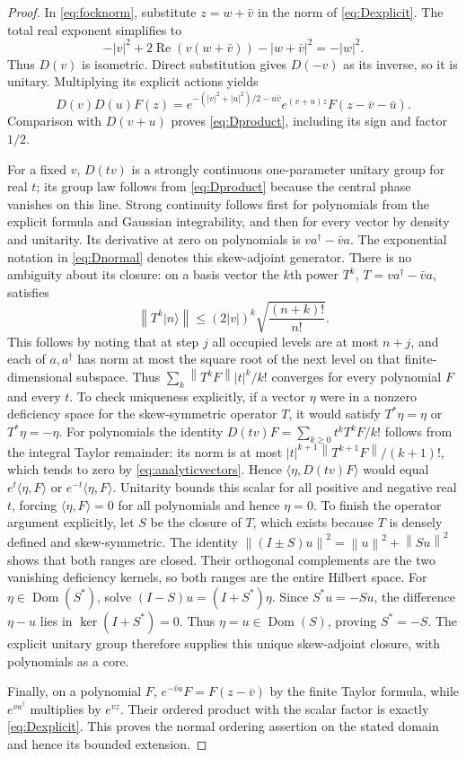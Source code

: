 \documentclass[11pt]{article}
\numberwithin{equation}{section}
\theoremstyle{definition}
\theoremstyle{remark}
\newcommand{\norm}[1]{\left\lVert#1\right\rVert}
\begin{document}
\begin{proof}
In \eqref{eq:focknorm}, substitute $z=w+\bar v$ in the norm of
\eqref{eq:Dexplicit}. The total real exponent simplifies to
\[
 -|v|^2+2\operatorname{Re}(v(w+\bar v))-|w+\bar v|^2=-|w|^2.
\]
Thus $D(v)$ is isometric. Direct substitution gives $D(-v)$ as its
inverse, so it is unitary. Multiplying its explicit actions yields
\[
 D(v)D(u)F(z)=e^{-(|v|^2+|u|^2)/2-u\bar v}
            e^{(v+u)z}F(z-\bar v-\bar u).
\]
Comparison with $D(v+u)$ proves \eqref{eq:Dproduct}, including its
sign and factor $1/2$.

For a fixed $v$, $D(tv)$ is a strongly continuous one-parameter
unitary group for real $t$; its group law follows from
\eqref{eq:Dproduct} because the central phase vanishes on this
line. Strong continuity follows first for polynomials from the
explicit formula and Gaussian integrability, and then for every
vector by density and unitarity. Its derivative at zero on
polynomials is $v a^\dagger-\bar v a$. The exponential notation in
\eqref{eq:Dnormal} denotes this skew-adjoint generator.
There is no ambiguity about its closure: on a basis vector the
$k$th power $T^k$, $T=v a^\dagger-\bar v a$, satisfies
\begin{equation}\label{eq:analyticvectors}
 \norm{T^k|n\rangle}\leq(2|v|)^k
              \sqrt{\frac{(n+k)!}{n!}}.
\end{equation}
This follows by noting that at step $j$ all occupied levels are at
most $n+j$, and each of $a,a^\dagger$ has norm at most the square
root of the next level on that finite-dimensional subspace.
Thus $\sum_k\norm{T^kF}|t|^k/k!$ converges for every polynomial
$F$ and every $t$.
To check uniqueness explicitly, if a vector $\eta$ were in a
nonzero deficiency space for the skew-symmetric operator $T$, it
would satisfy $T^*\eta=\eta$ or $T^*\eta=-\eta$.
For polynomials the identity
$D(tv)F=\sum_{k\geq0}t^kT^kF/k!$ follows from the integral Taylor
remainder: its norm is at most
$|t|^{k+1}\norm{T^{k+1}F}/(k+1)!$, which tends to zero by
\eqref{eq:analyticvectors}. Hence
$\langle\eta,D(tv)F\rangle$ would equal
$e^t\langle\eta,F\rangle$ or
$e^{-t}\langle\eta,F\rangle$. Unitarity bounds this scalar
for all positive and negative real $t$, forcing
$\langle\eta,F\rangle=0$ for all polynomials and hence $\eta=0$.
To finish the operator argument explicitly, let $S$ be the closure
of $T$, which exists because $T$ is densely defined and
skew-symmetric. The identity
$\norm{(I\pm S)u}^2=\norm{u}^2+\norm{Su}^2$ shows that both
ranges are closed. Their orthogonal complements are the two
vanishing deficiency kernels, so both ranges are the entire
Hilbert space. For $\eta\in\operatorname{Dom}(S^*)$, solve
$(I-S)u=(I+S^*)\eta$. Since $S^*u=-Su$, the difference $\eta-u$
lies in $\ker(I+S^*)=0$. Thus $\eta=u\in\operatorname{Dom}(S)$,
proving $S^*=-S$. The explicit unitary group therefore supplies
this unique skew-adjoint closure, with polynomials as a core.

Finally, on a polynomial $F$, $e^{-\bar v a}F=F(z-\bar v)$ by the
finite Taylor formula, while $e^{v a^\dagger}$ multiplies by
$e^{vz}$. Their ordered product with the scalar factor is exactly
\eqref{eq:Dexplicit}. This proves the normal ordering assertion
on the stated domain and hence its bounded extension.
\end{proof}
\end{document}
